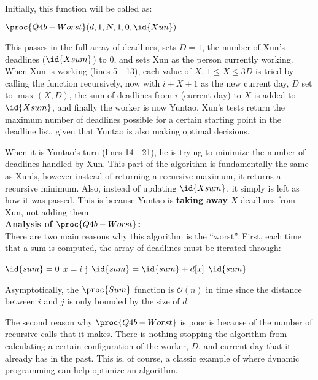 Initially, this function will be called as:
\begin{center}
    $\proc{Q4b-Worst}(d, 1, N, 1, 0, \id{Xun})$
\end{center}
This passes in the full array of deadlines, sets $D = 1$, the number of Xun's deadlines ($\id{Xsum}$) to 0, and sets Xun as the person currently working.
When Xun is working (lines 5 - 13), each value of $X$, $1 \le X \le 3D$ is tried by calling the function recursively,
now with $i + X + 1$ as the new current day, $D$ set to $\max(X, D)$, the sum of deadlines from $i$ (current day) to $X$ is added to $\id{Xsum}$, and finally the worker is now Yuntao.
Xun's tests return the maximum number of deadlines possible for a certain starting point in the deadline list, given that Yuntao is also making optimal decisions.

When it is Yuntao's turn (lines 14 - 21), he is trying to minimize the number of deadlines handled by Xun.
This part of the algorithm is fundamentally the same as Xun's, however instead of returning a recursive maximum, it returns a recursive minimum.
Also, instead of updating $\id{Xsum}$, it simply is left as how it was passed. This is because Yuntao is \textbf{taking away} $X$ deadlines from Xun,
not adding them. \\


\textbf{Analysis of $\proc{Q4b-Worst}$:}\\
There are two main reasons why this algorithm is the ``worst''.
First, each time that a sum is computed, the array of deadlines must be iterated through:

\begin{spacing}{1.2}
    \begin{codebox}
        \li $\id{sum} = 0$
        \li \For $x = i$ \To j
        \Do
        \li $\id{sum} = \id{sum} + d[x]$
        \End
        \li \Return $\id{sum}$
    \end{codebox}
\end{spacing}
\vspace{5mm}
Asymptotically, the $\proc{Sum}$ function is $\mathcal{O}(n)$ in time since the distance between $i$ and $j$ is only bounded by the size of $d$.

The second reason why $\proc{Q4b-Worst}$ is poor is because of the number of recursive calls that it makes.
There is nothing stopping the algorithm from calculating a certain configuration of the worker, $D$, and current day that it already has in the past.
This is, of course, a classic example of where dynamic programming can help optimize an algorithm.

